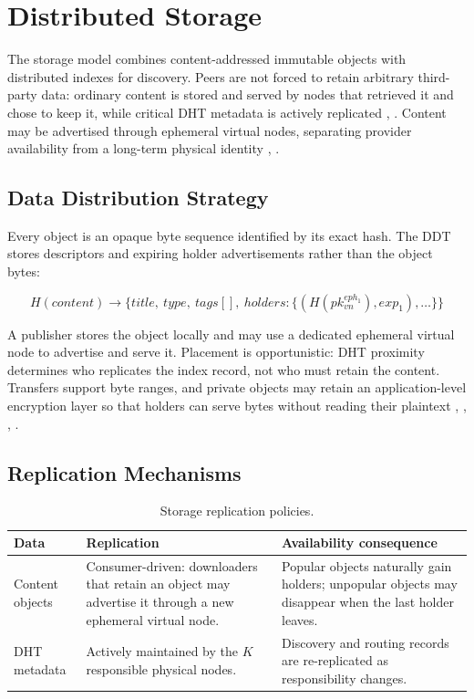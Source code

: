 \documentclass[
  12pt,
  oneside,
  a4paper,
  chapter=TITLE,
  section=TITLE,
  english,
  brazil
]{abntex2}
\begin{document}
\section{Distributed Storage}

The storage model combines content-addressed immutable objects with distributed
indexes for discovery. Peers are not forced to retain arbitrary third-party data:
ordinary content is stored and served by nodes that retrieved it and chose to keep
it, while critical DHT metadata is actively replicated \cite{augustine2022byzantine}, \cite{qian2016garlic}. Content may be
advertised through ephemeral virtual nodes, separating provider availability from a
long-term physical identity \cite{mirzaei2018pk}, \cite{qian2016garlic}.

\subsection{Data Distribution Strategy}

Every object is an opaque byte sequence identified by its exact hash. The DDT stores
descriptors and expiring holder advertisements rather than the object bytes:

\[
H(content) \rightarrow \{title,\ type,\ tags[],\
holders:\{(H(pk_{vn}^{eph_1}),exp_1),\ldots\}\}
\]

A publisher stores the object locally and may use a dedicated ephemeral virtual node
to advertise and serve it. Placement is opportunistic: DHT proximity determines who
replicates the index record, not who must retain the content. Transfers support byte
ranges, and private objects may retain an application-level encryption layer so that
holders can serve bytes without reading their plaintext \cite{augustine2022byzantine}, \cite{qian2016garlic}, \cite{bos2017kyber}, \cite{nist2024fips203}.

\subsection{Replication Mechanisms}

\begin{table}[H]
\centering
\caption{Storage replication policies.}
\label{tab:storage-replication-policies}
\begin{tabularx}{\textwidth}{L{0.24\textwidth} Y Y}
\toprule
\textbf{Data} & \textbf{Replication} & \textbf{Availability consequence} \\
\midrule
Content objects & Consumer-driven: downloaders that retain an object may advertise
it through a new ephemeral virtual node. & Popular objects naturally gain holders;
unpopular objects may disappear when the last holder leaves. \\
DHT metadata & Actively maintained by the $K$ responsible physical nodes. &
Discovery and routing records are re-replicated as responsibility changes. \\
\bottomrule
\end{tabularx}
\end{table}
\end{document}
